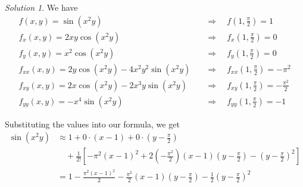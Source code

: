 \documentclass[
]{book}
\theoremstyle{definition}
\theoremstyle{definition}
\theoremstyle{definition}
\theoremstyle{definition}
\theoremstyle{remark}
\newtheorem*{solution}{Solution}
\begin{document}
\begin{solution}

We have
\begin{align*}
f(x,y) = \sin(x^2y) \quad & \Rightarrow \quad f\left(1,\frac{\pi}{2}\right )=1\\
f_x(x,y) = 2xy\cos(x^2y) \quad & \Rightarrow \quad f_x\left(1,\frac{\pi}{2}\right )=0 \\
f_y(x,y) = x^2\cos(x^2y) \quad & \Rightarrow \quad f_y\left(1,\frac{\pi}{2}\right )=0 \\ 
f_{xx}(x,y) = 2y\cos(x^2y)-4x^2y^2\sin(x^2y) \quad & \Rightarrow \quad f_{xx}\left(1,\frac{\pi}{2}\right )= -\pi^2\\
f_{xy}(x,y) = 2x\cos(x^2y)-2x^3y\sin(x^2y) \quad & \Rightarrow \quad f_{xy}\left(1,\frac{\pi}{2}\right )= -\frac{\pi^2}{2}\\
f_{yy}(x,y) = -x^4\sin(x^2y) \quad & \Rightarrow \quad f_{yy}\left(1,\frac{\pi}{2}\right )= -1
\end{align*}

Substituting the values into our formula, we get
\begin{align*}
\sin(x^2y) & \approx 1+ 0\cdot(x-1)+0\cdot \left(y-\frac{\pi}{2}\right)\\ & \quad +\frac{1}{2!}\left[-\pi^2(x-1)^2+2\left(-\frac{\pi^2}{2}\right)(x-1)\left(y-\frac{\pi}{2}\right) - \left(y-\frac{\pi}{2}\right)^2\right]\\
&= 1 -\frac{\pi^2(x-1)^2}{2}-\frac{\pi^2}{2}(x-1)\left(y-\frac{\pi}{2}\right) -\frac{1}{2}\left(y-\frac{\pi}{2}\right)^2
\end{align*}

\end{solution}

  
\end{document}
